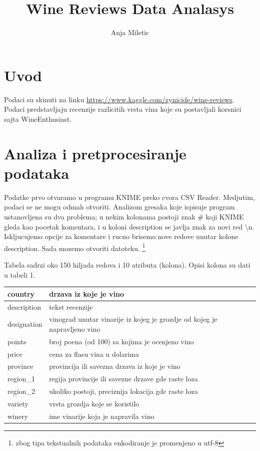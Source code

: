 \documentclass[11pt]{article} %
\title{Wine Reviews Data Analasys}
\author{Anja Miletic}
\begin{document}
\maketitle
\newpage

\doublespacing
\tableofcontents
\singlespacing
\newpage


\section{Uvod}
Podaci su skinuti na linku \url{https://www.kaggle.com/zynicide/wine-reviews}. Podaci predstavljaju recenzije razlicitih vrsta vina
koje su postavljali korsnici sajta WineEnthusiast.

\section{Analiza i pretprocesiranje podataka}
Podatke prvo otvaramo u programu KNIME preko cvora CSV Reader. Medjutim, podaci se ne mogu odmah otvoriti.
Analizom gresaka koje ispisuje program ustanovljena su dva problema; u nekim kolonama postoji znak \# koji 
KNIME gleda kao pocetak komentara, i u koloni description se javlja znak za novi red \textbackslash n. Iskljucujemo opcije 
za komentare i rucno brisemo nove redove unutar kolone description. Sada mozemo otvoriti datoteku.
\footnote{zbog tipa tekstualnih podataka enkodiranje je promenjeno u utf-8}

Tabela sadrzi oko 150 hiljada redova i 10 atributa (kolona). Opisi kolona su dati u tabeli 1.
\newline\newline
\begin{tabular}{|l|l|}
\hline
country & drzava iz koje je vino \\
\hline
description & tekst recenzije \\
\hline
designation & vinograd unutar vinarije iz kojeg je grozdje od kojeg je napravljeno vino \\
\hline
points & broj poena (od 100) sa kojima je ocenjeno vino \\
\hline
price & cena za flasu vina u dolarima \\
\hline
province & provincija ili savezna drzava iz koje je vino \\
\hline
region\_1 & regija provincije ili savezne drzave gde raste loza \\
\hline
region\_2 & ukoliko postoji, preciznija lokacija gde raste loza \\
\hline
variety & vrsta grozdja koje se koristilo \\
\hline
winery & ime vinarije koja je napravila vino \\
\hline
\end{tabular}
\end{document}
